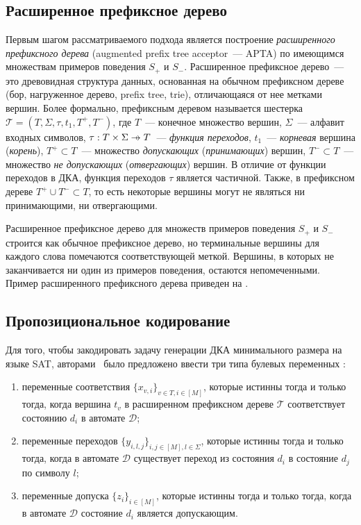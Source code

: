 \subsection{Расширенное префиксное дерево}
\label{sec:review:sat-dfa-inf:apta}
Первым шагом рассматриваемого подхода является построение \emph{расширенного префиксного дерева} (augmented prefix tree acceptor~{---} APTA) по имеющимся множествам примеров поведения $S_{+}$ и $S_{-}$. 
Расширенное префиксное дерево~--- это древовидная структура данных, основанная на обычном префиксном дереве (бор, нагруженное дерево, prefix tree, trie), отличающаяся от нее метками вершин.
Более формально, префиксным деревом называется шестерка $\mathcal{T} = \left(T,\Sigma,\tau,t_{1},T^{+}, T^{-}\right)$, где $T$~{---} конечное множество вершин, $\Sigma$~{---} алфавит входных символов, $\tau: T \times \Sigma \pto T$~{---} \emph{функция переходов}, $t_{1}$~{---} \emph{корневая} вершина (\emph{корень}), $T^{+} \subset T$~{---} множество \emph{допускающих} (\emph{принимающих}) вершин, $T^{-} \subset T$~{---} множество \emph{не допускающих} (\emph{отвергающих}) вершин.
В отличие от функции переходов в ДКА, функция переходов $\tau$ является частичной. 
Также, в префиксном дереве $T^{+} \cup T^{-} \subset T$, то есть некоторые вершины могут не являться ни принимающими, ни отвергающими. 

Расширенное префиксное дерево для множеств примеров поведения $S_{+}$ и $S_{-}$ строится как обычное префиксное дерево, но терминальные вершины для каждого слова помечаются соответствующей меткой. Вершины, в которых не заканчивается ни один из примеров поведения, остаются непомеченными. Пример расширенного префиксного дерева приведен на .

\subsection{Пропозициональное кодирование} \label{sec:review:sat-dfa-inf:hv-encoding}


Для того, чтобы закодировать задачу генерации ДКА минимального размера на языке SAT, авторами~\cite{heule-icgi10} было предложено ввести три типа булевых переменных :
\begin{enumerate}
  \item переменные соответствия $\{x_{v,i}\}_{v \in T, i \in \left[M\right]}$, которые истинны тогда и только тогда, когда вершина $t_{v}$ в расширенном префиксном дереве $\mathcal{T}$ соответствует состоянию $d_{i}$ в автомате $\mathcal{D}$;
  \item переменные переходов $\{y_{i,l,j}\}_{i,j \in \left[M\right],l \in \Sigma}$, которые истинны тогда и только тогда, когда в автомате $\mathcal{D}$ существует переход из состояния $d_{i}$ в состояние $d_{j}$ по символу $l$;
  \item переменные допуска $\{z_{i}\}_{i \in \left[M\right]}$, которые истинны тогда и только тогда, когда в автомате $\mathcal{D}$ состояние $d_{i}$ является допускающим.
\end{enumerate}

